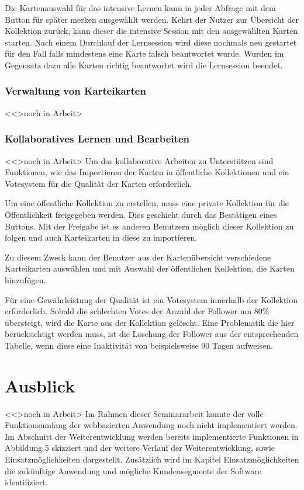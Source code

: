 Die Kartenauswahl für das intensive Lernen kann in jeder Abfrage mit dem Button \glqq für später merken\grqq{}
 ausgewählt werden. Kehrt der Nutzer zur Übersicht der Kollektion zurück, kann dieser die intensive Session mit den ausgewählten Karten starten. Nach einem Durchlauf der Lernsession wird diese nochmals neu gestartet für den Fall falls mindestens eine Karte falsch beantwortet wurde. Wurden im Gegensatz dazu alle Karten richtig beantwortet wird die Lernsession beendet.

\subsubsection{Verwaltung von Karteikarten}
<<>noch in Arbeit>





\subsubsection{Kollaboratives Lernen und Bearbeiten}
<<>noch in Arbeit>
Um das kollaborative Arbeiten zu Unterstützen sind Funktionen, wie das Importieren der Karten in öffentliche Kollektionen und ein Votesystem für die Qualität der Karten erforderlich. 

Um eine öffentliche Kollektion zu erstellen, muss eine private Kollektion für die Öffentlichkeit freigegeben werden. Dies geschieht durch das Bestätigen eines Buttons. Mit der Freigabe ist es anderen Benutzern möglich dieser Kollektion zu folgen und auch Karteikarten in diese zu importieren. 

Zu diesem Zweck kann der Benutzer aus der Kartenübersicht verschiedene Karteikarten auswählen und mit Auswahl der öffentlichen Kollektion, die Karten hinzufügen. 

Für eine Gewährleistung der Qualität ist ein Votesystem innerhalb der Kollektion erforderlich. Sobald die schlechten Votes der Anzahl der Follower um 80{\%} übersteigt, wird die Karte aus der Kollektion gelöscht. Eine Problematik die hier berücksichtigt werden muss, ist die Löschung der Follower aus der entsprechenden Tabelle, wenn diese eine Inaktivität von beispielsweise 90 Tagen aufweisen. 


\section{Ausblick}
<<>noch in Arbeit>
Im Rahmen dieser Seminararbeit konnte der volle Funktionsumfang der webbasierten Anwendung noch nicht implementiert werden. Im Abschnitt der Weiterentwicklung werden bereits implementierte Funktionen in Abbildung 5 skizziert und der weitere Verlauf der Weiterentwicklung, sowie Einsatzmöglichkeiten dargestellt. Zusätzlich wird im Kapitel Einsatzmöglichkeiten die zukünftige Anwendung und mögliche Kundensegmente der Software identifiziert.


